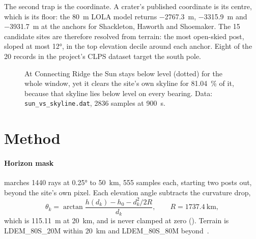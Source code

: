 \documentclass[conference]{IEEEtran}
\begin{document}
The second trap is the coordinate. A crater's published coordinate is its
centre, which is its floor: the \qty{80}{\metre} LOLA model returns
\qty{-2767.3}{\metre}, \qty{-3315.9}{\metre} and \qty{-3931.7}{\metre} at the
anchors for Shackleton, Haworth and Shoemaker. The \num{15} candidate sites are
therefore resolved from terrain: the most open-skied post, sloped at most
\ang{12}, in the top elevation decile around each anchor. Eight of the \num{20}
records in the project's CLPS dataset target the south pole.

\begin{figure}[t]
\centering
{}
\caption{At Connecting Ridge the Sun stays below level (dotted) for the whole
window, yet it clears the site's own skyline for \qty{81.04}{\percent} of it,
because that skyline lies below level on every bearing. Data:
\texttt{sun\_vs\_skyline.dat}, \num{2836} samples at \qty{900}{\second}.}
\label{fig:sunskyline}
\end{figure}

\section{Method}

\paragraph{Horizon mask}  marches \num{1440} rays at
\ang{0.25} to \qty{50}{\kilo\metre}, \num{555} samples each, starting two posts
out, beyond the site's own pixel. Each elevation angle
subtracts the curvature drop,
\begin{equation}
\theta_k = \arctan\frac{h(d_k) - h_0 - d_k^2/2R}{d_k},\qquad
R = \qty{1737.4}{\kilo\metre},
\label{eq:theta}
\end{equation}
which is \qty{115.11}{\metre} at \qty{20}{\kilo\metre}, and is never clamped at
zero (). Terrain is LDEM\_80S\_20M within
\qty{20}{\kilo\metre} and LDEM\_80S\_80M beyond~\cite{lola_gdr_polar,smith2010lola}.
\end{document}
